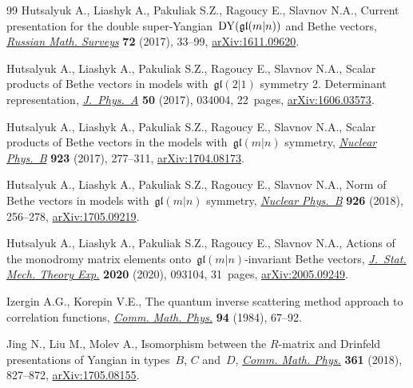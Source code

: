 \begin{thebibliography}{99}
Hutsalyuk A., Liashyk A., Pakuliak S.Z., Ragoucy E., Slavnov N.A., Current
 presentation for the double super-Yangian~${\rm DY}(\mathfrak{gl}(m|n))$ and Bethe
 vectors, \href{https://doi.org/10.1070/RM9754}{\textit{Russian Math.
 Surveys}} \textbf{72} (2017), 33--99,
 \href{http://arxiv.org/abs/1611.09620}{arXiv:1611.09620}.

Hutsalyuk A., Liashyk A., Pakuliak S.Z., Ragoucy E., Slavnov N.A., Scalar
 products of {B}ethe vectors in models with~{$\mathfrak{gl}(2|1)$} symmetry 2.
 {D}eterminant representation,
 \href{https://doi.org/10.1088/1751-8121/50/3/034004}{\textit{J.~Phys.~A}}
 \textbf{50} (2017), 034004, 22~pages,
 \href{http://arxiv.org/abs/1606.03573}{arXiv:1606.03573}.

Hutsalyuk A., Liashyk A., Pakuliak S.Z., Ragoucy E., Slavnov N.A., Scalar
 products of {B}ethe vectors in the models with~$\mathfrak{gl}(m|n)$ symmetry,
 \href{https://doi.org/10.1016/j.nuclphysb.2017.07.020}{\textit{Nuclear
 Phys.~B}} \textbf{923} (2017), 277--311,
 \href{http://arxiv.org/abs/1704.08173}{arXiv:1704.08173}.

Hutsalyuk A., Liashyk A., Pakuliak S.Z., Ragoucy E., Slavnov N.A., Norm of
 {B}ethe vectors in models with~{$\mathfrak{gl}(m|n)$} symmetry,
 \href{https://doi.org/10.1016/j.nuclphysb.2017.11.006}{\textit{Nuclear
 Phys.~B}} \textbf{926} (2018), 256--278,
 \href{http://arxiv.org/abs/1705.09219}{arXiv:1705.09219}.

Hutsalyuk A., Liashyk A., Pakuliak S.Z., Ragoucy E., Slavnov N.A., Actions of
 the monodromy matrix elements onto~{$\mathfrak{gl}(m|n)$}-invariant {B}ethe
 vectors, \href{https://doi.org/10.1088/1742-5468/abacb2}{\textit{J.~Stat.
 Mech. Theory Exp.}} \textbf{2020} (2020), 093104, 31~pages,
 \href{http://arxiv.org/abs/2005.09249}{arXiv:2005.09249}.

Izergin A.G., Korepin V.E., The quantum inverse scattering method approach to
 correlation functions,
 \href{https://doi.org/10.1007/BF01212350}{\textit{Comm. Math. Phys.}}
 \textbf{94} (1984), 67--92.

Jing N., Liu M., Molev A., Isomorphism between the {$R$}-matrix and {D}rinfeld
 presentations of {Y}angian in types~{$B$}, {$C$} and~{$D$},
 \href{https://doi.org/10.1007/s00220-018-3185-x}{\textit{Comm. Math. Phys.}}
 \textbf{361} (2018), 827--872,
 \href{http://arxiv.org/abs/1705.08155}{arXiv:1705.08155}.


\end{thebibliography}

